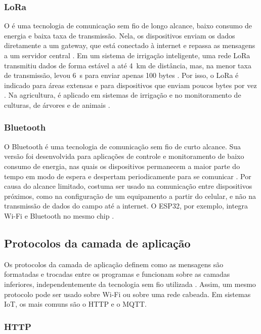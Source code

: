 \subsubsection{LoRa}
 
O  é uma tecnologia de comunicação sem fio de longo alcance, baixo consumo de energia e baixa taxa de transmissão. Nela, os dispositivos enviam os dados diretamente a um gateway, que está conectado à internet e repassa as mensagens a um servidor central \cite{augustin2016}. Em um sistema de irrigação inteligente, uma rede LoRa transmitiu dados de forma estável a até 4~km de distância, mas, na menor taxa de transmissão, levou 6~s para enviar apenas 100 bytes \cite{zhang2025}. Por isso, o LoRa é indicado para áreas extensas e para dispositivos que enviam poucos bytes por vez \cite{augustin2016}. Na agricultura, é aplicado em sistemas de irrigação e no monitoramento de culturas, de árvores e de animais \cite{pagano2023}.
 
\subsubsection{Bluetooth}
 
O Bluetooth é uma tecnologia de comunicação sem fio de curto alcance. Sua versão  foi desenvolvida para aplicações de controle e monitoramento de baixo consumo de energia, nas quais os dispositivos permanecem a maior parte do tempo em modo de espera e despertam periodicamente para se comunicar \cite{gomez2012}. Por causa do alcance limitado, costuma ser usado na comunicação entre dispositivos próximos, como na configuração de um equipamento a partir do celular, e não na transmissão de dados do campo até a internet. O ESP32, por exemplo, integra Wi-Fi e Bluetooth no mesmo chip \cite{espressif}.
 
\subsection{Protocolos da camada de aplicação}
\label{sec:protocolos-aplicacao}
 
Os protocolos da camada de aplicação definem como as mensagens são formatadas e trocadas entre os programas e funcionam sobre as camadas inferiores, independentemente da tecnologia sem fio utilizada \cite{kurose2021}. Assim, um mesmo protocolo pode ser usado sobre Wi-Fi ou sobre uma rede cabeada. Em sistemas IoT, os mais comuns são o HTTP e o MQTT.
 
\subsubsection{HTTP}
 
